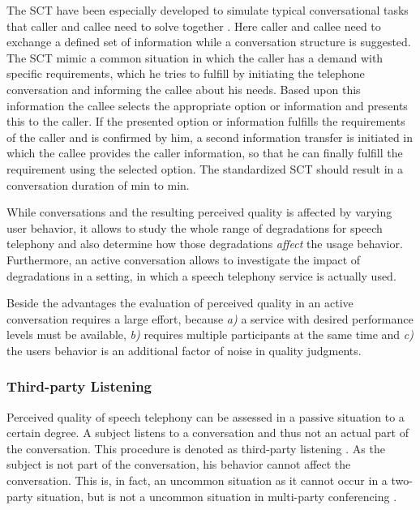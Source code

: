The \acf{SCT} have been especially developed to simulate typical conversational tasks that caller and callee need to solve together \cite[\cf,][p. 76]{moller_assessment_2000}.
Here caller and callee need to exchange a defined set of information while a conversation structure is suggested.
The \ac{SCT} mimic a common situation in which the caller has a demand with specific requirements, which he tries to fulfill by initiating the telephone conversation and informing the callee about his needs.
Based upon this information the callee selects the appropriate option or information and presents this to the caller.
If the presented option or information fulfills the requirements of the caller and is confirmed by him, a second information transfer is initiated in which the callee provides the caller information, so that he can finally fulfill the requirement using the selected option.
The standardized \acs{SCT} \citep{itu-t_p.805:_2007} should result in a conversation duration of \unit[3]{min} to \unit[7]{min}.

While conversations and the resulting perceived quality is affected by varying user behavior, it allows to study the whole range of degradations for speech telephony and also determine how those degradations \emph{affect} the usage behavior.
Furthermore, an active conversation allows to investigate the impact of degradations in a setting, in which a speech telephony service is actually used.

Beside the advantages the evaluation of perceived quality in an active conversation requires a large effort, because \emph{a)} a service with desired performance levels must be available, \emph{b)} requires multiple participants at the same time and \emph{c)} the users behavior is an additional factor of noise in quality judgments.

\subsubsection*{Third-party Listening}
Perceived quality of speech telephony can be assessed in a passive situation to a certain degree.
A subject listens to a conversation and thus not an actual part of the conversation.
This procedure is denoted as third-party listening \citep[\cf, ][p. 13]{itu-t_p.832:_2000}.
As the subject is not part of the conversation, his behavior cannot affect the conversation.
This is, in fact, an uncommon situation as it cannot occur in a two-party situation, but is not a uncommon situation in multi-party conferencing .

